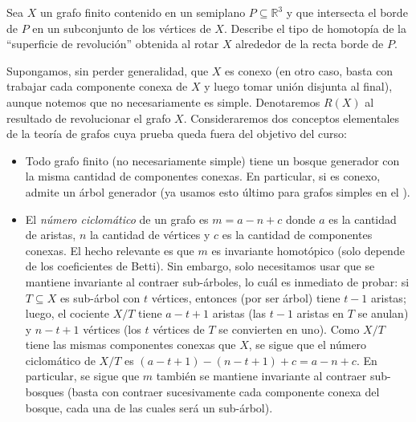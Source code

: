 \setcounter{eje}{21}
\begin{ejer}
Sea $X$ un grafo finito contenido en un semiplano $P \subseteq \mathbb{R}^3$ y que intersecta el borde de $P$ en un subconjunto de los vértices de $X$. Describe el tipo de homotopía de la “superficie de revolución” obtenida al rotar $X$ alrededor de la recta borde de $P$.
\end{ejer}
\begin{sol}
Supongamos, sin perder generalidad, que $X$ es conexo (en otro caso, basta con trabajar cada componente conexa de $X$ y luego tomar unión disjunta al final), aunque notemos que no necesariamente es simple. Denotaremos $R(X)$ al resultado de revolucionar el grafo $X$. Consideraremos dos conceptos elementales de la teoría de grafos cuya prueba queda fuera del objetivo del curso:
\begin{itemize}[leftmargin=1.2em]
\item Todo grafo finito (no necesariamente simple) tiene un bosque generador con la misma cantidad de componentes conexas. En particular, si es conexo, admite un árbol generador (ya usamos esto último para grafos simples en el ).

\item El \emph{número ciclomático} de un grafo es $m = a - n + c$ donde $a$ es la cantidad de aristas, $n$ la cantidad de vértices y $c$ es la cantidad de componentes conexas. El hecho relevante es que $m$ es invariante homotópico (solo depende de los coeficientes de Betti). Sin embargo, solo necesitamos usar que se mantiene invariante al contraer sub-árboles, lo cuál es inmediato de probar: si $T \subseteq X$ es sub-árbol con $t$ vértices, entonces (por ser árbol) tiene $t-1$ aristas; luego, el cociente $X/T$ tiene $a-t + 1$ aristas (las $t-1$ aristas en $T$ se anulan) y $n-t+1$ vértices (los $t$ vértices de $T$ se convierten en uno). Como $X/T$ tiene las mismas componentes conexas que $X$, se sigue que el número ciclomático de $X/T$ es $(a-t + 1)-(n-t+1)+c=a-n+c$. En particular, se sigue que $m$ también se mantiene invariante al contraer sub-bosques (basta con contraer sucesivamente cada componente conexa del bosque, cada una de las cuales será un sub-árbol).
\end{itemize}


\end{sol}
